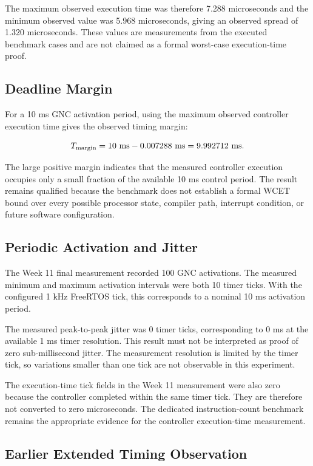 \documentclass[11pt,a4paper]{article}
\begin{document}
The maximum observed execution time was therefore 7.288 microseconds and the minimum observed value was 5.968 microseconds, giving an observed spread of 1.320 microseconds. These values are measurements from the executed benchmark cases and are not claimed as a formal worst-case execution-time proof.

\subsection{Deadline Margin}

For a 10 ms GNC activation period, using the maximum observed controller execution time gives the observed timing margin:

\begin{equation}
T_{\mathrm{margin}}=10\ {\rm ms}-0.007288\ {\rm ms}=9.992712\ {\rm ms}.
\end{equation}

The large positive margin indicates that the measured controller execution occupies only a small fraction of the available 10 ms control period. The result remains qualified because the benchmark does not establish a formal WCET bound over every possible processor state, compiler path, interrupt condition, or future software configuration.


\subsection{Periodic Activation and Jitter}

The Week 11 final measurement recorded 100 GNC activations. The measured minimum and maximum activation intervals were both 10 timer ticks. With the configured 1 kHz FreeRTOS tick, this corresponds to a nominal 10 ms activation period.

The measured peak-to-peak jitter was 0 timer ticks, corresponding to 0 ms at the available 1 ms timer resolution. This result must not be interpreted as proof of zero sub-millisecond jitter. The measurement resolution is limited by the timer tick, so variations smaller than one tick are not observable in this experiment.

The execution-time tick fields in the Week 11 measurement were also zero because the controller completed within the same timer tick. They are therefore not converted to zero microseconds. The dedicated instruction-count benchmark remains the appropriate evidence for the controller execution-time measurement.

\subsection{Earlier Extended Timing Observation}
\end{document}
